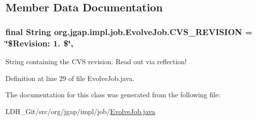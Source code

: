 \subsection{Member Data Documentation}
\hypertarget{classorg_1_1jgap_1_1impl_1_1job_1_1_evolve_job_a9aff9f20b1ed224f7f5513d6acc8495a}{
\subsubsection[{C\-V\-S\-\_\-\-R\-E\-V\-I\-S\-I\-O\-N}]{\setlength{\rightskip}{0pt plus 5cm}final String org.\-jgap.\-impl.\-job.\-Evolve\-Job.\-C\-V\-S\-\_\-\-R\-E\-V\-I\-S\-I\-O\-N = \char`\"{}\$Revision\-: 1. \$\char`\"{}\hspace{0.3cm}{\ttfamily [static]}, {\ttfamily [private]}}}\label{classorg_1_1jgap_1_1impl_1_1job_1_1_evolve_job_a9aff9f20b1ed224f7f5513d6acc8495a}
String containing the C\-V\-S revision. Read out via reflection! 

Definition at line 29 of file Evolve\-Job.\-java.



The documentation for this class was generated from the following file\-:\begin{DoxyCompactItemize}
\item 
L\-D\-H\-\_\-\-Git/src/org/jgap/impl/job/\hyperlink{_evolve_job_8java}{Evolve\-Job.\-java}\end{DoxyCompactItemize}
